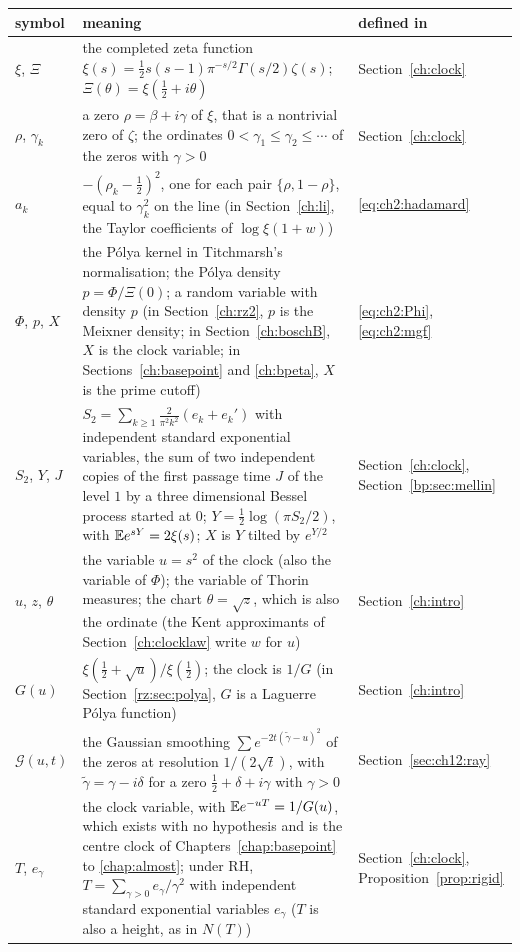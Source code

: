 {\small
\begin{longtable}{@{}p{}p{}p{}@{}}
\toprule
symbol & meaning & defined in\\
\midrule
\endhead
$\xi$, $\Xi$ & \raggedright the completed zeta function ${\xi(s)=\frac12s(s-1)\pi^{-s/2}\Gamma(s/2)\zeta(s)}$; $\Xi(\theta)=\xi(\frac12+i\theta)$ & \raggedright Section~\ref{ch:clock}\tabularnewline
$\rho$, $\gamma_k$ & \raggedright a zero $\rho=\beta+i\gamma$ of $\xi$, that is a nontrivial zero of $\zeta$; the ordinates ${0<\gamma_1\le\gamma_2\le\cdots}$ of the zeros with $\gamma>0$ & \raggedright Section~\ref{ch:clock}\tabularnewline
$a_k$ & \raggedright $-(\rho_k-\frac12)^2$, one for each pair $\{\rho,1-\rho\}$, equal to $\gamma_k^2$ on the line (in Section~\ref{ch:li}, the Taylor coefficients of $\log\xi(1+w)$) & \raggedright \eqref{eq:ch2:hadamard}\tabularnewline
$\Phi$, $p$, $X$ & \raggedright the P\'olya kernel in Titchmarsh's normalisation; the P\'olya density ${p=\Phi/\Xi(0)}$; a random variable with density $p$ (in Section~\ref{ch:rz2}, $p$ is the Meixner density; in Section~\ref{ch:boschB}, $X$ is the clock variable; in Sections~\ref{ch:basepoint} and \ref{ch:bpeta}, $X$ is the prime cutoff) & \raggedright \eqref{eq:ch2:Phi}, \eqref{eq:ch2:mgf}\tabularnewline
$S_2$, $Y$, $J$ & \raggedright ${S_2=\sum_{k\ge1}\frac2{\pi^2k^2}(e_k+e_k')}$ with independent standard exponential variables, the sum of two independent copies of the first passage time $J$ of the level $1$ by a three dimensional Bessel process started at $0$; ${Y=\frac12\log(\pi S_2/2)}$, with ${\mathbb{E} e^{sY}=2\xi(s)}$; $X$ is $Y$ tilted by $e^{Y/2}$ & \raggedright Section~\ref{ch:clock}, Section~\ref{bp:sec:mellin}\tabularnewline
$u$, $z$, $\theta$ & \raggedright the variable $u=s^2$ of the clock (also the variable of $\Phi$); the variable of Thorin measures; the chart $\theta=\sqrt z$, which is also the ordinate (the Kent approximants of Section~\ref{ch:clocklaw} write $w$ for $u$) & \raggedright Section~\ref{ch:intro}\tabularnewline
$G(u)$ & \raggedright $\xi(\frac12+\sqrt u)/\xi(\frac12)$; the clock is $1/G$ (in Section~\ref{rz:sec:polya}, $G$ is a Laguerre P\'olya function) & \raggedright Section~\ref{ch:intro}\tabularnewline
$\mathcal G(u,t)$ & \raggedright the Gaussian smoothing ${\sum e^{-2t(\tilde\gamma-u)^2}}$ of the zeros at resolution $1/(2\sqrt t)$, with $\tilde\gamma=\gamma-i\delta$ for a zero $\frac12+\delta+i\gamma$ with $\gamma>0$ & \raggedright Section~\ref{sec:ch12:ray}\tabularnewline
$T$, $e_\gamma$ & \raggedright the clock variable, with ${\mathbb{E} e^{-uT}=1/G(u)}$, which exists with no hypothesis and is the centre clock of Chapters~\ref{chap:basepoint} to \ref{chap:almost}; under RH, ${T=\sum_{\gamma>0}e_\gamma/\gamma^2}$ with independent standard exponential variables $e_\gamma$ ($T$ is also a height, as in $N(T)$) & \raggedright Section~\ref{ch:clock}, Proposition~\ref{prop:rigid}\tabularnewline

\end{longtable}}
